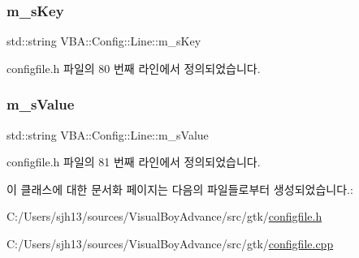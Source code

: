 \subsubsection{\texorpdfstring{m\+\_\+s\+Key}{m\_sKey}}
{\footnotesize\ttfamily std\+::string V\+B\+A\+::\+Config\+::\+Line\+::m\+\_\+s\+Key}



configfile.\+h 파일의 80 번째 라인에서 정의되었습니다.

\mbox{\label{class_v_b_a_1_1_config_1_1_line_a49ce629848d486c0a3f0ee4e5d7d015a}} 
\subsubsection{\texorpdfstring{m\+\_\+s\+Value}{m\_sValue}}
{\footnotesize\ttfamily std\+::string V\+B\+A\+::\+Config\+::\+Line\+::m\+\_\+s\+Value}



configfile.\+h 파일의 81 번째 라인에서 정의되었습니다.



이 클래스에 대한 문서화 페이지는 다음의 파일들로부터 생성되었습니다.\+:\begin{DoxyCompactItemize}
\item 
C\+:/\+Users/sjh13/sources/\+Visual\+Boy\+Advance/src/gtk/\mbox{\hyperlink{configfile_8h}{configfile.\+h}}\item 
C\+:/\+Users/sjh13/sources/\+Visual\+Boy\+Advance/src/gtk/\mbox{\hyperlink{configfile_8cpp}{configfile.\+cpp}}\end{DoxyCompactItemize}
